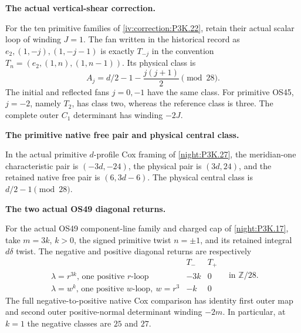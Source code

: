 \begin{proposition}\hypertarget{tag-01U4}{}\label{iv:correction:P3K.25}

\textbf{The actual vertical-shear correction.}\par
For the ten primitive families of
\cref{iv:correction:P3K.22}, retain their actual scalar loop of
winding \(J=1\). The fan written in the historical record as
\(e_2,(1,-j),(1,-j-1)\) is exactly \(T_{-j}\) in the convention
\(T_n=(e_2,(1,n),(1,n-1))\). Its physical class is
\[
 A_j=d/2-1-\frac{j(j+1)}2\pmod{28}.
\]
The initial and reflected fans \(j=0,-1\) have the same class.
For primitive OS45, \(j=-2\), namely \(T_2\), has class two,
whereas the reference class is three. The complete outer
\(C_1\) determinant has winding \(-2J\).
\end{proposition}

\begin{proposition}\hypertarget{tag-01U5}{}\label{iv:correction:P3K.27}

\textbf{The primitive native free pair and physical central class.}\par
In the actual primitive \(d\)-profile Cox framing of
\cref{night:P3K.27}, the meridian-one characteristic pair is
\((-3d,-24)\), the physical pair is \((3d,24)\), and the retained
native free pair is \((6,3d-6)\). The physical central class is
\(d/2-1\pmod{28}\).
\end{proposition}

\begin{proposition}\hypertarget{tag-01U0}{}\label{iv:correction:P3K.17}

\textbf{The two actual OS49 diagonal returns.}\par
For the actual OS49 component-line family and charged cap
of \cref{night:P3K.17}, take \(m=3k\), \(k>0\), the signed primitive
twist \(n=\pm1\), and its retained integral \(d\delta\) twist.
The negative and positive diagonal returns are respectively
\[
 \begin{array}{c|cc}
 &T_-&T_+\\\hline
 \lambda=r^{3k}\text{, one positive }r\text{-loop}&-3k&0\\
 \lambda=w^k\text{, one positive }w\text{-loop},\ w=r^3&-k&0
 \end{array}\quad\text{in }\mathbb Z/28.
\]
The full negative-to-positive native Cox comparison has identity
first outer map and second outer positive-normal determinant winding
\(-2m\). In particular, at \(k=1\) the negative classes are
\(25\) and \(27\).
\end{proposition}

